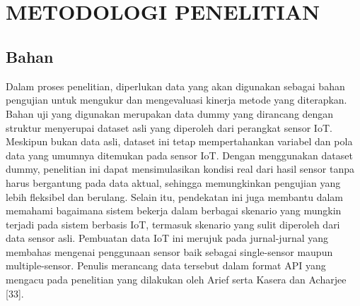 \chapter[METODOLOGI PENELITIAN]{\\ METODOLOGI PENELITIAN}
\section{Bahan}
Dalam proses penelitian, diperlukan data yang akan digunakan sebagai bahan pengujian untuk mengukur dan mengevaluasi kinerja metode yang diterapkan. Bahan uji yang digunakan merupakan data dummy yang dirancang dengan struktur menyerupai dataset asli yang diperoleh dari perangkat sensor IoT. Meskipun bukan data asli, dataset ini tetap mempertahankan variabel dan pola data yang umumnya ditemukan pada sensor IoT. Dengan menggunakan dataset dummy, penelitian ini dapat mensimulasikan kondisi real dari hasil sensor tanpa harus bergantung pada data aktual, sehingga memungkinkan pengujian yang lebih fleksibel dan berulang. Selain itu, pendekatan ini juga membantu dalam memahami bagaimana sistem bekerja dalam berbagai skenario yang mungkin terjadi pada sistem berbasis IoT, termasuk skenario yang sulit diperoleh dari data sensor asli. Pembuatan data IoT ini merujuk pada jurnal-jurnal yang membahas mengenai penggunaan sensor baik sebagai single-sensor maupun multiple-sensor. Penulis merancang data tersebut dalam format API yang mengacu pada penelitian yang dilakukan oleh Arief \cite{Triawan2023} serta Kasera dan Acharjee [33]. 

